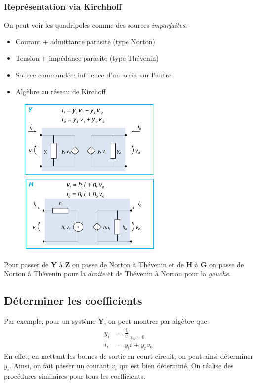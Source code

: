 \documentclass{report}
\begin{document}
\subsubsection{Représentation via Kirchhoff}
On peut voir les quadripoles comme des sources \textit{imparfaites}:
\begin{itemize}
\item Courant + admittance parasite (type Norton)
\item Tension + impédance parasite (type Thévenin)
\item Source commandée: influence d'un accès sur l'autre
\item Algèbre ou réseau de Kirchoff
\end{itemize} 
\begin{figure}[H]
\centering
\includegraphics[width=7cm]{img/Ytransfo.png}
\includegraphics[width=7cm]{img/Htransfo.png}
\end{figure}
Pour passer de \textbf{Y} à \textbf{Z} on passe de Norton à Thévenin et de \textbf{H} à \textbf{G} on passe de Norton à Thévenin pour la \textit{droite} et de Thévenin à Norton pour la \textit{gauche}.

\subsection{Déterminer les coefficients}
Par exemple, pour un système \textbf{Y}, on peut montrer par algèbre que:
\begin{align*}
y_i &= \frac{i_i}{v_i} \biggl\vert_{v_o=0}\\
i_i &= y_i i + y_r v_o
\end{align*}
En effet, en mettant les bornes de sortie en court circuit, on peut ainsi déterminer $y_i$. Ainsi, on fait passer un courant $v_i$ qui est bien déterminé. On réalise des procédures similaires pour tous les coefficients.
\end{document}
